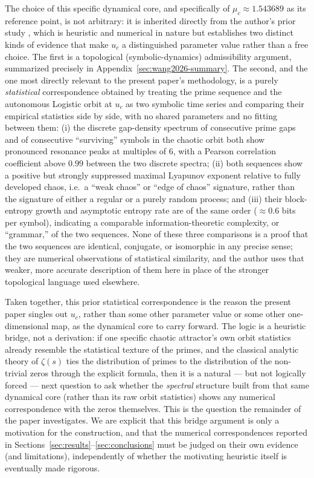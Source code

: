 \documentclass[mca,article,submit,oneauthor,pdftex]{Definitions/mdpi}
\begin{document}
The choice of this specific dynamical core, and specifically of $\mu_c\approx1.543689$
as its reference point, is not arbitrary: it is inherited directly from the
author's prior study \cite{wang2026}, which is heuristic and numerical in
nature but establishes two distinct kinds of evidence that make $u_c$ a
distinguished parameter value rather than a free choice. The first is a
topological (symbolic-dynamics) admissibility argument, summarized precisely
in Appendix~\ref{sec:wang2026-summary}. The second, and the one most directly
relevant to the present paper's methodology, is a purely \emph{statistical}
correspondence obtained by treating the prime sequence and the autonomous
Logistic orbit at $u_c$ as two symbolic time series and comparing their
empirical statistics side by side, with no shared parameters and no fitting
between them: (i) the discrete gap-density spectrum of consecutive prime
gaps and of consecutive ``surviving'' symbols in the chaotic orbit both
show pronounced resonance peaks at multiples of $6$, with a Pearson
correlation coefficient above $0.99$ between the two discrete spectra;
(ii) both sequences show a positive but strongly suppressed maximal
Lyapunov exponent relative to fully developed chaos, i.e.\ a ``weak chaos''
or ``edge of chaos'' signature, rather than the signature of either a
regular or a purely random process; and (iii) their block-entropy growth
and asymptotic entropy rate are of the same order ($\approx0.6$ bits per
symbol), indicating a comparable information-theoretic complexity, or
``grammar,'' of the two sequences. None of these three comparisons is a
proof that the two sequences are identical, conjugate, or isomorphic in
any precise sense; they are numerical observations of statistical
similarity, and the author uses that weaker, more accurate description of
them here in place of the stronger topological language used elsewhere.

Taken together, this prior statistical correspondence is the reason the
present paper singles out $u_c$, rather than some other parameter value or
some other one-dimensional map, as the dynamical core to carry forward. The
logic is a heuristic bridge, not a derivation: if one specific chaotic
attractor's own orbit statistics already resemble the statistical texture
of the primes, and the classical analytic theory of $\zeta(s)$ ties the
distribution of primes to the distribution of the non-trivial zeros through
the explicit formula, then it is a natural --- but not logically forced ---
next question to ask whether the \emph{spectral} structure built from that
same dynamical core (rather than its raw orbit statistics) shows any
numerical correspondence with the zeros themselves. This is the question
the remainder of the paper investigates. We are explicit that this bridge
argument is only a motivation for the construction, and that the numerical
correspondences reported in Sections~\ref{sec:results}--\ref{sec:conclusions}
must be judged on their own evidence (and limitations), independently of
whether the motivating heuristic itself is eventually made rigorous.
\end{document}
